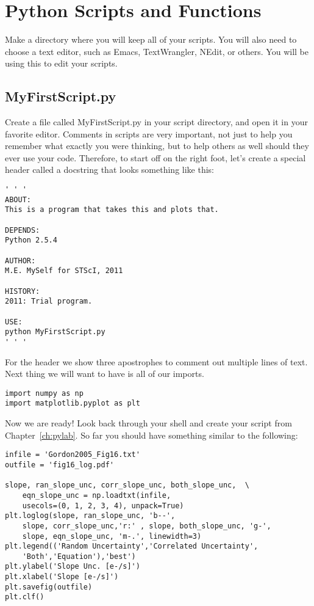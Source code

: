 \chapter{Python Scripts and Functions}
\label{ch:scripts}

Make a directory where you will keep all of your scripts.  You will
also need to choose a text editor, such as Emacs, TextWrangler, NEdit,
or others.  You will be using this to edit your scripts.
 
\section{MyFirstScript.py}

Create a file called MyFirstScript.py in your script directory, and
open it in your favorite editor.  Comments in scripts are very
important, not just to help you remember what exactly you were
thinking, but to help others as well should they ever use your code.
Therefore, to start off on the right foot, let's create a special header 
called a docstring that looks something like this:

\begin{verbatim}
' ' '
ABOUT:
This is a program that takes this and plots that.

DEPENDS:
Python 2.5.4

AUTHOR:
M.E. MySelf for STScI, 2011

HISTORY:
2011: Trial program.

USE:
python MyFirstScript.py
' ' '
\end{verbatim}

For the header we show three apostrophes to comment out multiple lines
of text.  Next thing we will want to have is all of our imports.

\begin{verbatim}
import numpy as np
import matplotlib.pyplot as plt 
\end{verbatim}

Now we are ready!  Look back through your shell and create your script
from Chapter~\ref{ch:pylab}.  So far you should have something similar
to the following:

\begin{verbatim}
infile = 'Gordon2005_Fig16.txt'
outfile = 'fig16_log.pdf' 

slope, ran_slope_unc, corr_slope_unc, both_slope_unc,  \
    eqn_slope_unc = np.loadtxt(infile, 
    usecols=(0, 1, 2, 3, 4), unpack=True) 
plt.loglog(slope, ran_slope_unc, 'b--',  
    slope, corr_slope_unc,'r:' , slope, both_slope_unc, 'g-',  
    slope, eqn_slope_unc, 'm-.', linewidth=3) 
plt.legend(('Random Uncertainty','Correlated Uncertainty',  
    'Both','Equation'),'best')
plt.ylabel('Slope Unc. [e-/s]') 
plt.xlabel('Slope [e-/s]') 
plt.savefig(outfile) 
plt.clf()
\end{verbatim}

